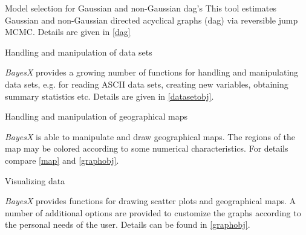 \begin{stanza}{Model selection for Gaussian and non-Gaussian dag's}
This tool estimates Gaussian and non-Gaussian directed acyclical
graphs (dag) via reversible jump MCMC. Details are given in
\autoref{dag}
\end{stanza}

\begin{stanza}{Handling and manipulation of data sets}

{\em BayesX} provides a growing number of functions for handling
and manipulating data sets, e.g. for reading ASCII data sets,
creating new variables, obtaining summary statistics etc. Details
are given in \autoref{datasetobj}.
\end{stanza}

\begin{stanza}{Handling and manipulation of geographical maps}

{\em BayesX} is able to manipulate and draw geographical maps. The
regions of the map may be colored according to some numerical
characteristics. For details compare \autoref{map} and
\autoref{graphobj}.
\end{stanza}

\begin{stanza}{Visualizing data}

{\em BayesX} provides functions for drawing scatter plots and
geographical maps. A number of additional options are provided to
customize the graphs according to the personal needs of the user.
Details can be found in \autoref{graphobj}.
\end{stanza}

